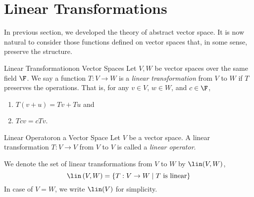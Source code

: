 \documentclass[linearalgebraI]{subfiles}
\begin{document}

    \section{Linear Transformations}

    \begin{remark}
        In previous section, we developed the theory of abstract vector space. It is now natural to consider those functions defined on vector spaces that, in some sense, preserve the structure.
    \end{remark}

    \begin{definition}{Linear Transformation}{on Vector Spaces}
        Let $V, W$ be vector spaces over the same field $\F$. We say a function $T:V\to W$ is a \emph{linear transformation} from $V$ to $W$ if $T$ preserves the operations. That is, for any $v\in V$, $w\in W$, and $c\in \F$,
        \begin{enumerate}
            \item $T(v+u) = Tv+Tu$ and
            \item $Tcv = cTv$.
        \end{enumerate}
    \end{definition}

    \begin{definition}{Linear Operator}{on a Vector Space}
        Let $V$ be a vector space. A linear transformation $T:V\to V$ from $V$ to $V$ is called a \emph{linear operator}.
    \end{definition}

    \begin{remark}
        We denote the set of linear transformations from $V$ to $W$ by $\lin(V,W)$,
        \begin{equation*}
            \lin\left( V,W \right) = \left\lbrace T:V\to W\mid T\text{ is linear} \right\rbrace 
        \end{equation*}
        In case of $V=W$, we write $\lin(V)$ for simplicity.
    \end{remark}
\end{document}
